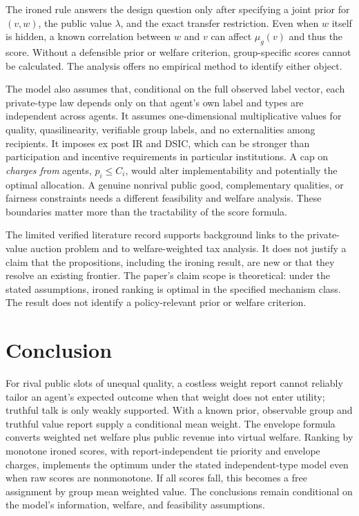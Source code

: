 \documentclass[11pt]{article}
\begin{document}
The ironed rule answers the design question only after specifying a joint prior for $(v,w)$, the public value $\lambda$, and the exact transfer restriction. Even when $w$ itself is hidden, a known correlation between $w$ and $v$ can affect $\mu_g(v)$ and thus the score. Without a defensible prior or welfare criterion, group-specific scores cannot be calculated. The analysis offers no empirical method to identify either object.

The model also assumes that, conditional on the full observed label vector, each private-type law depends only on that agent's own label and types are independent across agents. It assumes one-dimensional multiplicative values for quality, quasilinearity, verifiable group labels, and no externalities among recipients. It imposes ex post IR and DSIC, which can be stronger than participation and incentive requirements in particular institutions. A cap on \emph{charges from} agents, $p_i\le C_i$, would alter implementability and potentially the optimal allocation. A genuine nonrival public good, complementary qualities, or fairness constraints needs a different feasibility and welfare analysis. These boundaries matter more than the tractability of the score formula.

The limited verified literature record supports background links to the private-value auction problem and to welfare-weighted tax analysis. It does not justify a claim that the propositions, including the ironing result, are new or that they resolve an existing frontier. The paper's claim scope is theoretical: under the stated assumptions, ironed ranking is optimal in the specified mechanism class. The result does not identify a policy-relevant prior or welfare criterion.

\section{Conclusion}

For rival public slots of unequal quality, a costless weight report cannot reliably tailor an agent's expected outcome when that weight does not enter utility; truthful talk is only weakly supported. With a known prior, observable group and truthful value report supply a conditional mean weight. The envelope formula converts weighted net welfare plus public revenue into virtual welfare. Ranking by monotone ironed scores, with report-independent tie priority and envelope charges, implements the optimum under the stated independent-type model even when raw scores are nonmonotone. If all scores fall, this becomes a free assignment by group mean weighted value. The conclusions remain conditional on the model's information, welfare, and feasibility assumptions.
\end{document}
